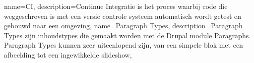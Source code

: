 
%
%

%


{
    name={CI},
    description={Continue Integratie is het proces waarbij code die weggeschreven is met een versie controle systeem automatisch wordt getest en gebouwd naar een omgeving, \texttt{\textcite{Guckenheimer2017}}}
}
{
    name=Paragraph Types,
    description={Paragraph Types zijn inhoudstypes die gemaakt worden met de Drupal module Paragraphs. Paragraph Types kunnen zeer uiteenlopend zijn, van een simpele blok met een afbeelding tot een ingewikkelde slideshow, \texttt{\textcite{Bobbeldijk2013}}}
}


